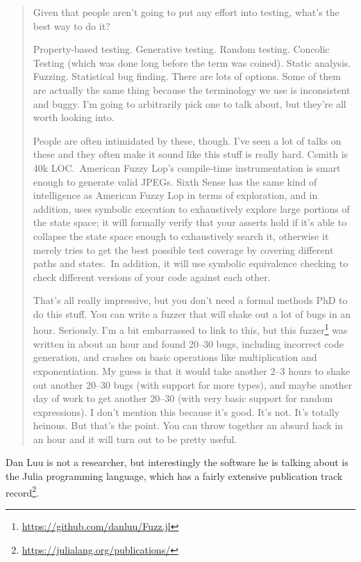 \begin{quote}
Given that people aren't going to put any effort into testing, what's the best way to do it?

Property-based testing. Generative testing. Random testing. Concolic Testing (which was done long before the term was coined). Static analysis. Fuzzing. Statistical bug finding. There are lots of options. Some of them are actually the same thing because the terminology we use is inconsistent and buggy. I'm going to arbitrarily pick one to talk about, but they're all worth looking into.

People are often intimidated by these, though.
I've seen a lot of talks on these and they often make it sound like this stuff is really hard.
Csmith is 40k LOC.\ 
American Fuzzy Lop's compile-time instrumentation is smart enough to generate valid JPEGs.
Sixth Sense has the same kind of intelligence as American Fuzzy Lop in terms of exploration, and in addition, uses symbolic execution to exhaustively explore large portions of the state space; it will formally verify that your asserts hold if it's able to collapse the state space enough to exhaustively search it, otherwise it merely tries to get the best possible test coverage by covering different paths and states.\ In addition, it will use symbolic equivalence checking to check different versions of your code against each other.

That's all really impressive, but you don't need a formal methods PhD to do this stuff.
You can write a fuzzer that will shake out a lot of bugs in an hour.
Seriously.
I'm a bit embarrassed to link to this, but this fuzzer\footnote{\url{https://github.com/danluu/Fuzz.jl}} was written in about an hour and found 20--30 bugs,
including incorrect code generation,
and crashes on basic operations like multiplication and exponentiation.
My guess is that it would take another 2--3 hours to shake out another 20--30 bugs (with support for more types), and maybe another day of work to get another 20--30 (with very basic support for random expressions).
I don't mention this because it's good.
It's not.
It's totally heinous.
But that's the point.
You can throw together an absurd hack in an hour and it will turn out to be pretty useful.
\end{quote}

Dan Luu is not a researcher,
but interestingly the software he is talking about is the Julia programming language\cite{DBLP:journals/corr/abs-1209-5145},
which has a fairly extensive publication track record\footnote{\url{https://julialang.org/publications/}}. 

